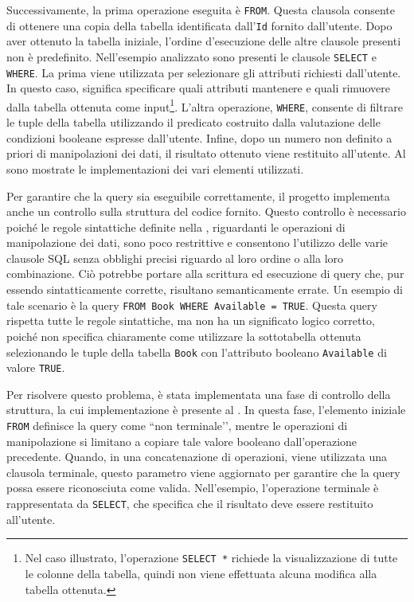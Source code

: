 \documentclass[12pt,a4paper,openright,twoside]{book}
\begin{document}
Successivamente, la prima operazione eseguita è \texttt{FROM}. Questa clausola consente di ottenere una copia della tabella identificata dall’\texttt{Id} fornito dall’utente. Dopo aver ottenuto la tabella iniziale, l’ordine d'esecuzione delle altre clausole presenti non è predefinito. Nell’esempio analizzato sono presenti le clausole \texttt{SELECT} e \texttt{WHERE}. La prima viene utilizzata per selezionare gli attributi richiesti dall’utente. In questo caso, significa specificare quali attributi mantenere e quali rimuovere dalla tabella ottenuta come input\footnote{Nel caso illustrato, l’operazione \texttt{SELECT *} richiede la visualizzazione di tutte le colonne della tabella, quindi non viene effettuata alcuna modifica alla tabella ottenuta.}. L’altra operazione, \texttt{WHERE}, consente di filtrare le tuple della tabella utilizzando il predicato costruito dalla valutazione delle condizioni booleane espresse dall’utente. Infine, dopo un numero non definito a priori di manipolazioni dei dati, il risultato ottenuto viene restituito all’utente. Al  sono mostrate le implementazioni dei vari elementi utilizzati.



Per garantire che la query sia eseguibile correttamente, il progetto implementa anche un controllo sulla struttura del codice fornito. Questo controllo è necessario poiché le regole sintattiche definite nella , riguardanti le operazioni di manipolazione dei dati, sono poco restrittive e consentono l’utilizzo delle varie clausole SQL senza obblighi precisi riguardo al loro ordine o alla loro combinazione. Ciò potrebbe portare alla scrittura ed esecuzione di query che, pur essendo sintatticamente corrette, risultano semanticamente errate. Un esempio di tale scenario è la query \texttt{FROM Book WHERE Available = TRUE}. Questa query rispetta tutte le regole sintattiche, ma non ha un significato logico corretto, poiché non specifica chiaramente come utilizzare la sottotabella ottenuta selezionando le tuple della tabella \texttt{Book} con l'attributo booleano \texttt{Available} di valore \texttt{TRUE}.

Per risolvere questo problema, è stata implementata una fase di controllo della struttura, la cui implementazione è presente al . In questa fase, l’elemento iniziale \texttt{FROM} definisce la query come ``non terminale’’, mentre le operazioni di manipolazione si limitano a copiare tale valore booleano dall’operazione precedente. Quando, in una concatenazione di operazioni, viene utilizzata una clausola terminale, questo parametro viene aggiornato per garantire che la query possa essere riconosciuta come valida. Nell’esempio, l’operazione terminale è rappresentata da \texttt{SELECT}, che specifica che il risultato deve essere restituito all’utente.
\end{document}
